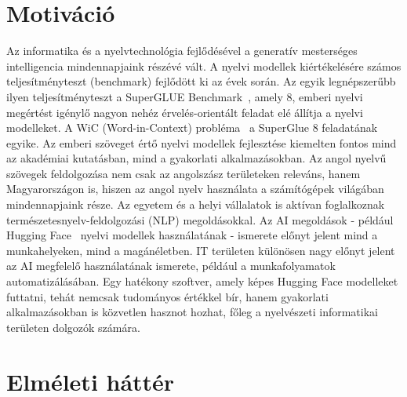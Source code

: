 \documentclass[12pt]{report}
\begin{document}
    \tableofcontents


    \chapter*{Motiváció}

    Az informatika és a nyelvtechnológia fejlődésével a generatív mesterséges intelligencia mindennapjaink részévé vált.
    A nyelvi modellek kiértékelésére számos teljesítményteszt (benchmark) fejlődött ki az évek során.
    Az egyik legnépszerűbb ilyen teljesítményteszt a SuperGLUE Benchmark~\cite{wang2020superglue}, amely 8, emberi nyelvi megértést igénylő nagyon nehéz érvelés-orientált feladat elé állítja a nyelvi modelleket.
    A WiC (Word-in-Context) probléma~\cite{pilehvar2019wic} a SuperGlue 8 feladatának egyike.
    Az emberi szöveget értő nyelvi modellek fejlesztése kiemelten fontos mind az akadémiai kutatásban, mind a gyakorlati alkalmazásokban.
    Az angol nyelvű szövegek feldolgozása nem csak az angolszász területeken releváns, hanem Magyarországon is, hiszen az angol nyelv használata a számítógépek világában mindennapjaink része.
    Az egyetem és a helyi vállalatok is aktívan foglalkoznak természetesnyelv-feldolgozási (NLP) megoldásokkal.
    Az AI megoldások - például Hugging Face~\cite{huggingfacehub} nyelvi modellek használatának - ismerete előnyt jelent mind a munkahelyeken, mind a magánéletben.
    IT területen különösen nagy előnyt jelent az AI megfelelő használatának ismerete, például a munkafolyamatok automatizálásában.
    Egy hatékony szoftver, amely képes Hugging Face modelleket futtatni, tehát nemcsak tudományos értékkel bír, hanem gyakorlati alkalmazásokban is közvetlen hasznot hozhat, főleg a nyelvészeti informatikai területen dolgozók számára.


    \chapter{Elméleti háttér}
\end{document}
